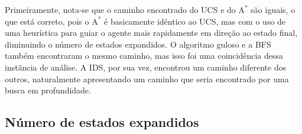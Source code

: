 \documentclass{article}
\begin{document}
\begin{figure}[H]
	\centering
\end{figure}

Primeiramente, nota-se que o caminho encontrado do UCS e do \(\text{A}^*\) são iguais, o que está correto, pois o \(\text{A}^*\) é basicamente idêntico ao UCS, mas com o uso de uma heurística
para guiar o agente mais rapidamente em direção ao estado final, diminuindo o número de estados expandidos. O algoritmo guloso e a BFS também encontraram o mesmo caminho, mas isso foi uma coincidência dessa instãncia de análise.
A IDS, por sua vez, encontrou um caminho diferente dos outros, naturalmente apresentando um caminho que seria encontrado por uma busca em profundidade.

\subsection{Número de estados expandidos}
\end{document}
